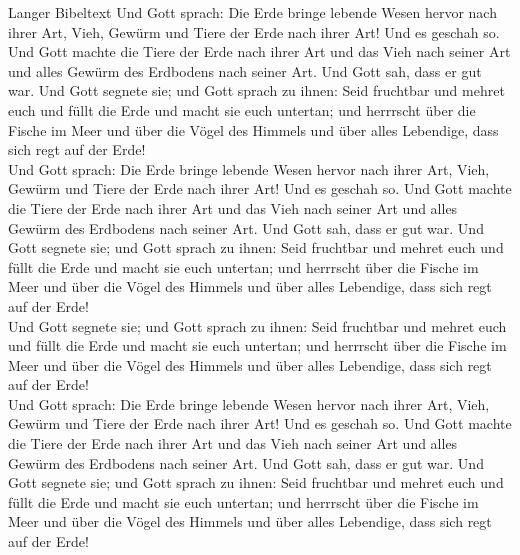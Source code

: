 \documentclass{beamer}
\begin{document}
\begin{frame}[allowframebreaks]{Langer Bibeltext}
    Und Gott sprach: Die Erde bringe lebende Wesen hervor nach ihrer Art, Vieh, Gewürm und Tiere der Erde nach ihrer Art! Und es geschah so. Und Gott machte die Tiere der Erde nach ihrer Art und das Vieh nach seiner Art und alles Gewürm des Erdbodens nach seiner Art. Und Gott sah, dass er gut war.
    Und Gott segnete sie; und Gott sprach zu ihnen: Seid fruchtbar und mehret euch und füllt die Erde und macht sie euch untertan; und herrrscht über die Fische im Meer und über die Vögel des Himmels und über alles Lebendige, dass sich regt auf der Erde!\\
    Und Gott sprach: Die Erde bringe lebende Wesen hervor nach ihrer Art, Vieh, Gewürm und Tiere der Erde nach ihrer Art! Und es geschah so. Und Gott machte die Tiere der Erde nach ihrer Art und das Vieh nach seiner Art und alles Gewürm des Erdbodens nach seiner Art. Und Gott sah, dass er gut war.
    Und Gott segnete sie; und Gott sprach zu ihnen: Seid fruchtbar und mehret euch und füllt die Erde und macht sie euch untertan; und herrrscht über die Fische im Meer und über die Vögel des Himmels und über alles Lebendige, dass sich regt auf der Erde!\\
    Und Gott segnete sie; und Gott sprach zu ihnen: Seid fruchtbar und mehret euch und füllt die Erde und macht sie euch untertan; und herrrscht über die Fische im Meer und über die Vögel des Himmels und über alles Lebendige, dass sich regt auf der Erde!\\
    Und Gott sprach: Die Erde bringe lebende Wesen hervor nach ihrer Art, Vieh, Gewürm und Tiere der Erde nach ihrer Art! Und es geschah so. Und Gott machte die Tiere der Erde nach ihrer Art und das Vieh nach seiner Art und alles Gewürm des Erdbodens nach seiner Art. Und Gott sah, dass er gut war.
    Und Gott segnete sie; und Gott sprach zu ihnen: Seid fruchtbar und mehret euch und füllt die Erde und macht sie euch untertan; und herrrscht über die Fische im Meer und über die Vögel des Himmels und über alles Lebendige, dass sich regt auf der Erde!\\
\end{frame}
\end{document}
